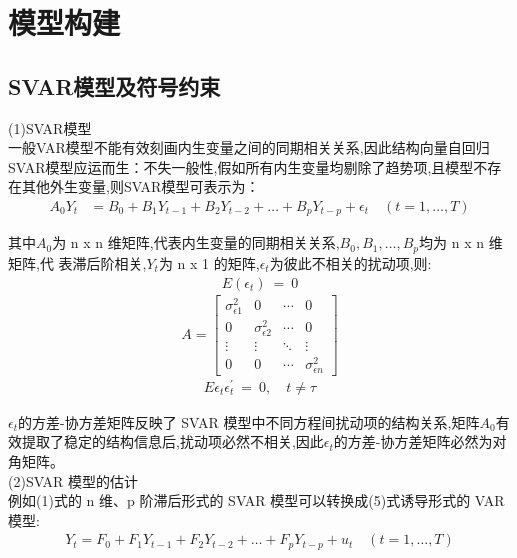 \documentclass{ijclclp}
\begin{document}
\section{模型构建}
\subsection{SVAR模型及符号约束}
(1)SVAR模型\\
一般VAR模型不能有效刻画内生变量之间的同期相关关系,因此结构向量自回归SVAR模型应运而生：不失一般性,假如所有内生变量均剔除了趋势项,且模型不存在其他外生变量,则SVAR模型可表示为：
\begin{equation}
\begin{aligned}
A_0 Y_t &= B_0 + B_{1}Y_{t-1} + B_{2}Y_{t-2} + \dots + B_{p}Y_{t-p} + \epsilon_t \quad(t=1,\dots ,T)
\end{aligned}
\tag{1}
\end{equation}

其中$A_0$为 n x n 维矩阵,代表内生变量的同期相关关系,$B_0,B_1,\dots,B_p$均为 n x n 维矩阵,代
表滞后阶相关,$Y_t$为 n x 1 的矩阵,$\epsilon_t$为彼此不相关的扰动项,则:
\begin{equation}
\begin{aligned}
E(\epsilon_t)\ =\ 0
\end{aligned}
\tag{2}
\end{equation}
\begin{equation}
A = \begin{bmatrix}
\sigma^2_{\epsilon 1} &0 & \cdots & 0 \\
0 & \sigma^2_{\epsilon 2} & \cdots &0 \\
\vdots & \vdots & \ddots & \vdots \\
0 & 0 & \cdots & \sigma^2_{\epsilon n}
\end{bmatrix}
\label{eq:my_matrix}
\tag{3}
\end{equation}
\begin{equation}
\begin{aligned}
E\epsilon_t\epsilon_t^{'}\ =\ 0, \quad t \neq \tau
\end{aligned}
\tag{4}
\end{equation}

$\epsilon_t$的方差-协方差矩阵反映了 SVAR 模型中不同方程间扰动项的结构关系,矩阵$A_0$有效提取了稳定的结构信息后,扰动项必然不相关,因此$\epsilon_t$的方差-协方差矩阵必然为对角矩阵。
\\
(2)SVAR 模型的估计\\

例如(1)式的 n 维、p 阶滞后形式的 SVAR 模型可以转换成(5)式诱导形式的 VAR 模型:
\begin{equation}
\begin{aligned}
Y_t = F_0 + F_{1}Y_{t-1} + F_{2}Y_{t-2} + \dots + F_{p}Y_{t-p} + u_t \quad(t=1,\dots ,T)
\end{aligned}
\tag{5}
\end{equation}
\end{document}
